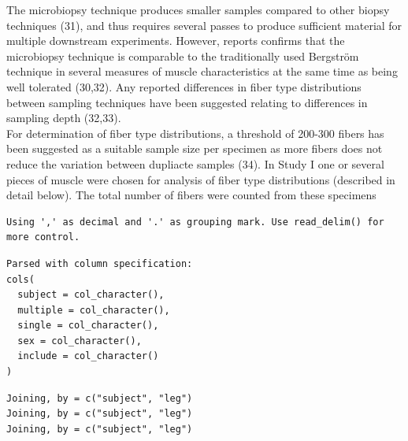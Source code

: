 \documentclass[twoside,10pt]{gihclass} %
\begin{document}
The microbiopsy technique produces smaller samples compared to other biopsy techniques
(31), and thus requires several passes to produce sufficient material for multiple downstream experiments. However, reports confirms that the microbiopsy technique is comparable to the traditionally used Bergström technique in several measures of muscle characteristics at the same time as being well tolerated
(30,32).
Any reported differences in fiber type distributions between sampling techniques have been suggested relating to differences in sampling depth
(32,33). \\
For determination of fiber type distributions, a threshold of 200-300 fibers has been suggested as a suitable sample size per specimen as more fibers does not reduce the variation between dupliacte samples
(34).
In Study I one or several pieces of muscle were chosen for analysis of fiber type distributions (described in detail below). The total number of fibers were counted from these specimens
\begin{verbatim}
Using ',' as decimal and '.' as grouping mark. Use read_delim() for more control.
\end{verbatim}
\begin{verbatim}
Parsed with column specification:
cols(
  subject = col_character(),
  multiple = col_character(),
  single = col_character(),
  sex = col_character(),
  include = col_character()
)
\end{verbatim}
\begin{verbatim}
Joining, by = c("subject", "leg")
Joining, by = c("subject", "leg")
Joining, by = c("subject", "leg")
\end{verbatim}
\end{document}
